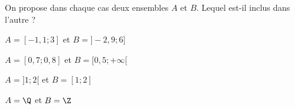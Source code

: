 
On propose dans chaque cas deux ensembles $A$ et $B$. Lequel est-il inclus dans l'autre ? \vspace{0.2cm} 

\begin{enumerate}

\begin{minipage}{0.48\linewidth}
\item $A=[-1,1;3]$ et $B=]-2,9;6]$ 
\item $A=[0,7;0,8]$ et $B=[0,5;+\infty[$
\end{minipage}
\hfill
\begin{minipage}{0.48\linewidth}
\item $A=]1;2[$ et $B=[1;2]$
\item $A=\Q$ et $B=\Z$
\end{minipage}

\end{enumerate}